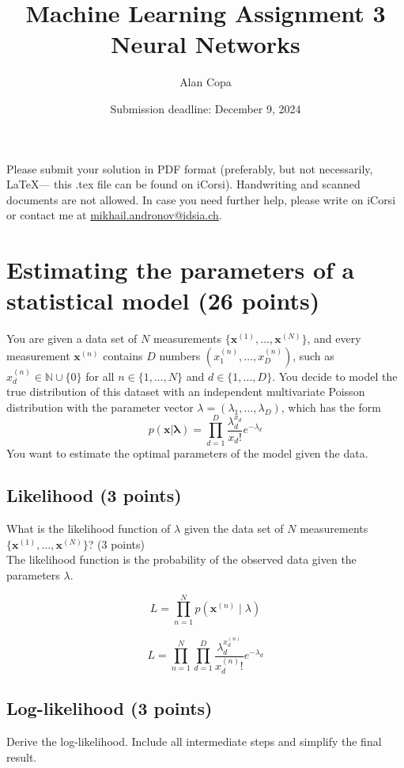 \documentclass[a4paper,12pt]{article}
\title{Machine Learning Assignment 3\\
Neural Networks}
\date{Submission deadline: December 9, 2024}
\author{Alan Copa}
\begin{document}
\maketitle

\noindent Please submit your solution in PDF format (preferably, but not necessarily, \LaTeX --- this .tex file can be found on iCorsi). Handwriting and scanned documents are not allowed. 
In case you need further help, please write on iCorsi or contact me at \href{mailto:mikhail.andronov@idsia.ch}{mikhail.andronov@idsia.ch}.

\section{Estimating the parameters of a statistical model (26 points)}
You are given a data set of $N$ measurements $\{\mathbf{x}^{(1)}, \ldots, \mathbf{x}^{(N)}\}$, and every measurement $\mathbf{x}^{(n)}$ contains $D$ numbers $(x^{(n)}_1, \ldots, x^{(n)}_D)$, such as $x^{(n)}_d \in \mathbb{N} \cup \{0\}$ for all $n \in \{1, \ldots, N\}$ and $d \in \{1, \ldots, D\}$. You decide to model the true distribution of this dataset with an independent multivariate Poisson distribution with the parameter vector $\lambda = (\lambda_1, \ldots, \lambda_D)$, which has the form
\begin{equation}
    p(\mathbf{x} | \mathbf{\lambda}) = \prod_{d=1}^{D}\frac{\lambda_d^{x_d}}{x_d!}e^{-\lambda_d}
\end{equation}
You want to estimate the optimal parameters of the model given the data.

\subsection{Likelihood (3 points)}
What is the likelihood function of $\lambda$ given the data set of $N$ measurements $\{\mathbf{x}^{(1)}, \ldots, \mathbf{x}^{(N)}\}$?
(3 points)
\\
The likelihood function is the probability of the observed data given the parameters \(\lambda\).

\[
L = \prod_{n=1}^{N} p(\mathbf{x}^{(n)} \mid \lambda)
\]

\[
L = \prod_{n=1}^{N} \prod_{d=1}^{D} \frac{\lambda_d^{x_d^{(n)}}}{x_d^{(n)}!} e^{-\lambda_d}
\]

\subsection{Log-likelihood (3 points)}
Derive the log-likelihood.
Include all intermediate steps and simplify the final result.
\end{document}
